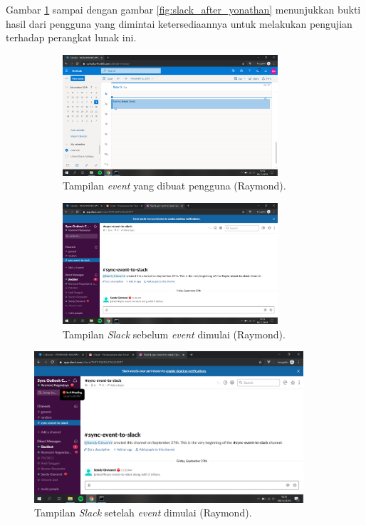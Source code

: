 Gambar \ref{fig:outlook_raymond} sampai dengan gambar \ref{fig:slack_after_yonathan} menunjukkan bukti hasil dari pengguna yang dimintai ketersediaannya untuk melakukan pengujian terhadap perangkat lunak ini. 

\begin{figure}[h]
\begin{subfigure}{8.5cm}
  \centering
  \includegraphics[width=8cm]{./Gambar/PengujianRaymond/Outlook.png}
  \caption{Tampilan \textit{event} yang dibuat pengguna (Raymond).}
  \label{fig:outlook_raymond}
\end{subfigure}
\begin{subfigure}{8.5cm}
  \centering
  \includegraphics[width=8cm]{./Gambar/PengujianRaymond/Slack_Before.png}
  \caption{Tampilan \textit{Slack} sebelum \textit{event} dimulai (Raymond).}
  \label{fig:slack_before_raymond}
\end{subfigure}
\caption{}
\end{figure}

\begin{figure}[h]
  \includegraphics[width=10cm]{./Gambar/PengujianRaymond/Slack_After.png}
  \centering
  \caption{Tampilan \textit{Slack} setelah \textit{event} dimulai (Raymond).}
  \label{fig:slack_after_raymond}
\end{figure}


